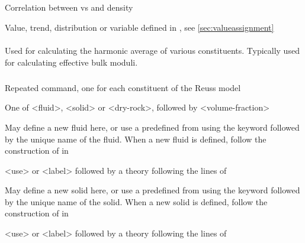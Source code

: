 {\subparagraph{}
 \slist
   \item \Description Correlation between vs and density
   \item \Argument Value, trend, distribution or variable defined in , see \autoref{sec:valueassignment}
   \item {}
 \elist

\paragraph{}
 \slist
   \item \Description Used for calculating the harmonic average of various constituents. Typically used for calculating effective bulk moduli. 
   \item \Argument
   \item \Default 
 \elist

\subparagraph{}
 \slist
   \item \Description Repeated command, one for each constituent of the Reuss model
   \item \Argument One of <fluid>, <solid> or <dry-rock>, followed by <volume-fraction>
   \item \Default
 \elist

 \slist
   \item \Description May define a new fluid here, or use a predefined  from  using the keyword  followed by the unique name of the fluid. When a new fluid is defined, follow the construction of  in 
   \item \Argument <use> or <label> followed by a theory following the lines of 
   \item \Default
 \elist

 \slist
   \item \Description May define a new solid here, or use a predefined  from  using the keyword  followed by the unique name of the solid. When a new solid is defined, follow the construction of  in 
   \item \Argument <use> or <label> followed by a theory following the lines of 
   \item \Default
 \elist

}
